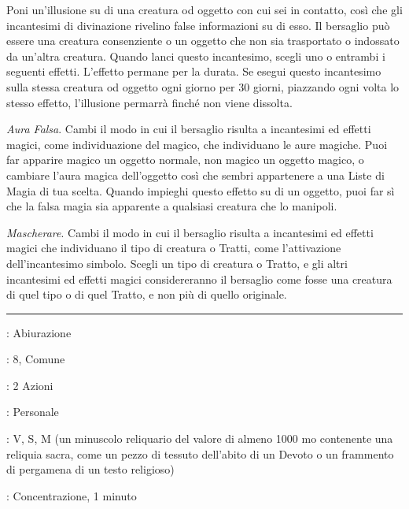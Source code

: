 \begin{multicols}{2}
Poni un'illusione su di una creatura od oggetto con cui sei in contatto, così che gli incantesimi di divinazione rivelino false informazioni su di esso. Il bersaglio può essere una creatura consenziente o un oggetto che non sia trasportato o indossato da un'altra creatura. Quando lanci questo incantesimo, scegli uno o entrambi i seguenti effetti. L'effetto permane per la durata. Se esegui questo incantesimo sulla stessa creatura od oggetto ogni giorno per 30 giorni, piazzando ogni volta lo stesso effetto, l'illusione permarrà finché non viene dissolta.

\emph{Aura Falsa}. Cambi il modo in cui il bersaglio risulta a incantesimi ed effetti magici, come individuazione del magico, che individuano le aure magiche. Puoi far apparire magico un oggetto normale, non magico un oggetto magico, o cambiare l'aura magica dell'oggetto così che sembri appartenere a una Liste di Magia di tua scelta. Quando impieghi questo effetto su di un oggetto, puoi far sì che la falsa magia sia apparente a qualsiasi creatura che lo manipoli.

\emph{Mascherare}. Cambi il modo in cui il bersaglio risulta a incantesimi ed effetti magici che individuano il tipo di creatura o Tratti, come l'attivazione dell'incantesimo simbolo. Scegli un tipo di creatura o Tratto, e gli altri incantesimi ed effetti magici considereranno il bersaglio come fosse una creatura di quel tipo o di quel Tratto, e non più di quello originale.

\smallskip\noindent\rule{\linewidth}{2pt} \hypertarget{Aura Sacra}{}\medskip{}
\noindent
\begin{description}[noitemsep, topsep=0pt, parsep=0pt, partopsep=0pt, leftmargin=0cm, labelwidth=2.8cm]
	\item[\textbf{Lista di Magia}]: Abiurazione
	\item[\textbf{Livello}]: 8, Comune
	\item[\textbf{T. di Lancio}]: 2 Azioni
	\item[\textbf{Gittata}]: Personale
	\item[\textbf{Componenti}]: V, S, M (un minuscolo reliquario del valore di almeno 1000 mo contenente una reliquia sacra, come un pezzo di tessuto dell'abito di un Devoto o un frammento di pergamena di un testo religioso)
	\item[\textbf{Durata}]: Concentrazione, 1 minuto
\end{description}


\end{multicols}
